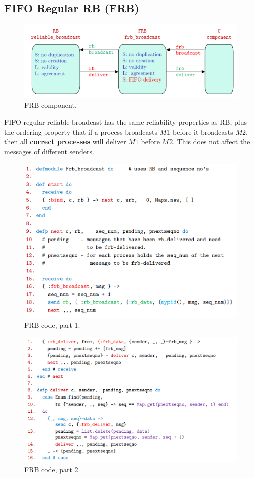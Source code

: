 \documentclass[11pt]{article}
\begin{document}
\subsection{FIFO Regular RB (FRB)}
\begin{figure}[htb!]
  \centering
  \caption{FRB component.}
  \includegraphics[scale=0.3]{fifo}
\end{figure}

FIFO regular reliable broadcast has the same reliability properties as RB, plus the ordering property that if a process broadcasts $M1$ before it broadcasts $M2$, then all \textbf{correct processes} will deliver $M1$ before $M2$.
This does not affect the messages of different senders.

\begin{figure}[htb!]
  \centering
  \caption{FRB code, part 1.}
  \includegraphics[scale=0.3]{frbcode1}
\end{figure}

\begin{figure}[htb!]
  \centering
  \caption{FRB code, part 2.}
  \includegraphics[scale=0.3]{frbcode2}
\end{figure}
\end{document}
